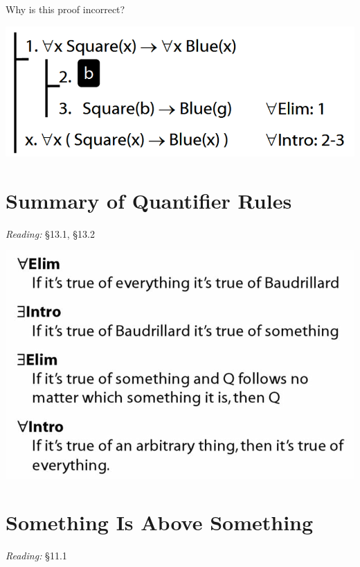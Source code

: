 \documentclass[12pt]{extarticle}
\begin{document}
\begin{multicols*}{3}
\begin{minipage}{\columnwidth}
Why is this proof incorrect?
 
\begin{center}
\includegraphics[scale=0.3]{img/proof_universal_intro_incorrect.png}
\end{center}
\end{minipage}
 
 
 
\section{Summary of Quantifier Rules}
 
\emph{Reading:} §13.1, §13.2
 
\begin{center}
\includegraphics[scale=0.3]{img/quantifier_rule_summary.png}
\end{center}
 
 
\section{Something Is Above Something}
 
\emph{Reading:} §11.1
 
\begin{minipage}{\columnwidth}
 

\end{minipage}
\end{multicols*}
\end{document}
